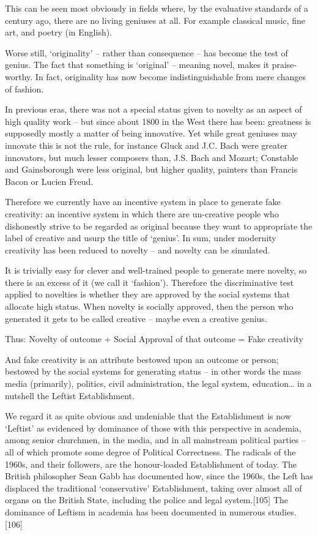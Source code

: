 \documentclass[
]{book}
\begin{document}
This can be seen most obviously in fields where, by the evaluative standards of a century ago, there are no living geniuses at all. For example classical music, fine art, and poetry (in English).

Worse still, `originality' -- rather than consequence -- has become the test of genius. The fact that something is `original' -- meaning novel, makes it praise-worthy. In fact, originality has now become indistinguishable from mere changes of fashion.

In previous eras, there was not a special status given to novelty as an aspect of high quality work -- but since about 1800 in the West there has been: greatness is supposedly mostly a matter of being innovative. Yet while great geniuses may innovate this is not the rule, for instance Gluck and J.C. Bach were greater innovators, but much lesser composers than, J.S. Bach and Mozart; Constable and Gainsborough were less original, but higher quality, painters than Francis Bacon or Lucien Freud.

Therefore we currently have an incentive system in place to generate fake creativity: an incentive system in which there are un-creative people who dishonestly strive to be regarded as original because they want to appropriate the label of creative and usurp the title of `genius'. In sum, under modernity creativity has been reduced to novelty -- and novelty can be simulated.

It is trivially easy for clever and well-trained people to generate mere novelty, so there is an excess of it (we call it `fashion'). Therefore the discriminative test applied to novelties is whether they are approved by the social systems that allocate high status. When novelty is socially approved, then the person who generated it gets to be called creative -- maybe even a creative genius.

Thus: Novelty of outcome + Social Approval of that outcome = Fake creativity

And fake creativity is an attribute bestowed upon an outcome or person; bestowed by the social systems for generating status -- in other words the mass media (primarily), politics, civil administration, the legal system, education\ldots{} in a nutshell the Leftist Establishment.

We regard it as quite obvious and undeniable that the Establishment is now `Leftist' as evidenced by dominance of those with this perspective in academia, among senior churchmen, in the media, and in all mainstream political parties -- all of which promote some degree of Political Correctness. The radicals of the 1960s, and their followers, are the honour-loaded Establishment of today. The British philosopher Sean Gabb has documented how, since the 1960s, the Left has displaced the traditional `conservative' Establishment, taking over almost all of organs on the British State, including the police and legal system.{[}105{]} The dominance of Leftism in academia has been documented in numerous studies.{[}106{]}
\end{document}
